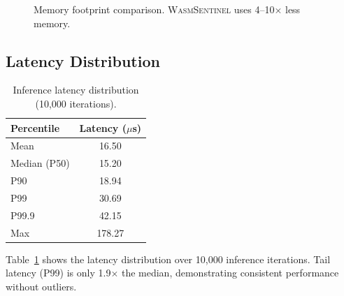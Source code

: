 \begin{figure}[t]
\centering
{}
\caption{Memory footprint comparison. \textsc{WasmSentinel} uses 4--10$\times$ less memory.}
\label{fig:memory}
\end{figure}

\subsection{Latency Distribution}

\begin{table}[t]
\centering
\caption{Inference latency distribution (10,000 iterations).}
\label{tab:latency-dist}
\begin{tabular}{lc}
\toprule
\textbf{Percentile} & \textbf{Latency ($\mu$s)} \\
\midrule
Mean & 16.50 \\
Median (P50) & 15.20 \\
P90 & 18.94 \\
P99 & 30.69 \\
P99.9 & 42.15 \\
Max & 178.27 \\
\bottomrule
\end{tabular}
\end{table}

Table~\ref{tab:latency-dist} shows the latency distribution over 10,000 inference iterations.
Tail latency (P99) is only 1.9$\times$ the median, demonstrating consistent performance without outliers.

